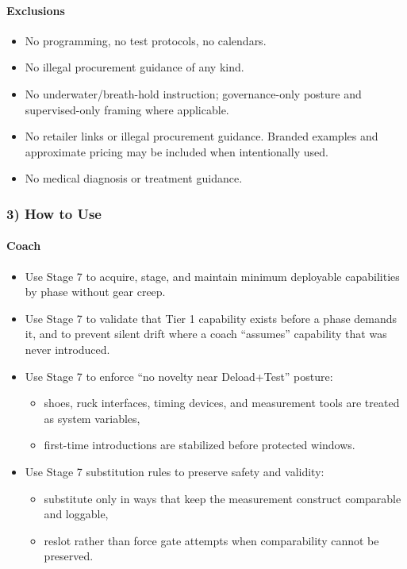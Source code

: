 \documentclass[10pt]{article}
\begin{document}
\paragraph*{Exclusions}

\begin{itemize}
\item No programming, no test protocols, no calendars.
\item No illegal procurement guidance of any kind.
\item No underwater/breath-hold instruction; governance-only posture and supervised-only framing where applicable.
\item No retailer links or illegal procurement guidance. Branded examples and approximate pricing may be included when intentionally used.
\item No medical diagnosis or treatment guidance.
\end{itemize}

\subsubsection*{3) How to Use}

\paragraph*{Coach}

\begin{itemize}
\item Use Stage 7 to acquire, stage, and maintain minimum deployable capabilities by phase without gear creep.
\item Use Stage 7 to validate that Tier 1 capability exists before a phase demands it, and to prevent silent drift where a coach “assumes” capability that was never introduced.
\item Use Stage 7 to enforce “no novelty near Deload+Test” posture:
  \begin{itemize}
  \item shoes, ruck interfaces, timing devices, and measurement tools are treated as system variables,
  \item first-time introductions are stabilized before protected windows.
  \end{itemize}
\item Use Stage 7 substitution rules to preserve safety and validity:
  \begin{itemize}
  \item substitute only in ways that keep the measurement construct comparable and loggable,
  \item reslot rather than force gate attempts when comparability cannot be preserved.
  \end{itemize}
\end{itemize}
\end{document}
